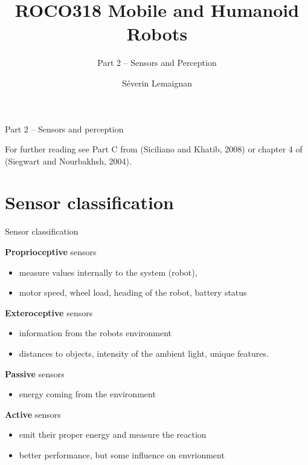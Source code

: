 \documentclass[compress]{beamer}
\title{ROCO318 \newline Mobile and Humanoid Robots}
\subtitle{Part 2 -- Sensors and Perception}
\date{}
\author{Séverin Lemaignan}
\institute{Centre for Neural Systems and Robotics\\{\bf Plymouth University}}
\begin{document}

\maketitle

\begin{frame}{Part 2 -- Sensors and perception}

    For further reading see Part C from (Siciliano and Khatib, 2008) or
    chapter 4 of (Siegwart and Nourbakhsh, 2004).

\end{frame}

\section{Sensor classification}\label{sensor-classification}

\begin{frame}{Sensor classification}

    \footnotesize
    \textbf{Proprioceptive} sensors

    \begin{itemize}

        \item
              measure values internally to the system (robot),
        \item
              \eg motor speed, wheel load, heading of the robot, battery status
    \end{itemize}

    \textbf{Exteroceptive} sensors

    \begin{itemize}

        \item
              information from the robots environment
        \item
              distances to objects, intensity of the ambient light, unique features.
    \end{itemize}

    \textbf{Passive} sensors

    \begin{itemize}

        \item
              energy coming from the environment
    \end{itemize}

    \textbf{Active} sensors

    \begin{itemize}

        \item
              emit their proper energy and measure the reaction
        \item
              better performance, but some influence on envrionment
    \end{itemize}

\end{frame}
\end{document}
